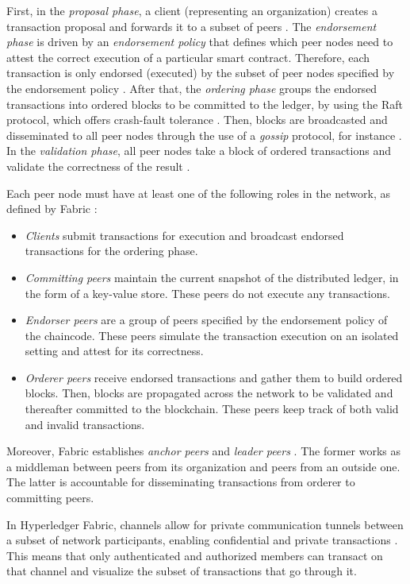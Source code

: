 \documentclass[runningheads]{llncs}
\begin{document}
First, in the \textit{proposal phase}, a client (representing an organization) creates a transaction proposal and forwards it to a subset of peers \cite{hyperledgerlabs}. The \textit{endorsement phase} is driven by an \textit{endorsement policy} that defines which peer nodes need to attest the correct execution of a particular smart contract. Therefore, each transaction is only endorsed (executed) by the subset of peer nodes specified by the endorsement policy \cite{fabric}. After that, the \textit{ordering phase} groups the endorsed transactions into ordered blocks to be committed to the ledger, by using the Raft protocol, which offers crash-fault tolerance \cite{fabric}. Then, blocks are broadcasted and disseminated to all peer nodes through the use of a \textit{gossip} protocol, for instance \cite{fabric}. In the \textit{validation phase}, all peer nodes take a block of ordered transactions and validate the correctness of the result \cite{abrunhosa_2021}.

Each peer node must have at least one of the following roles in the network, as defined by Fabric \cite{hyperledgerlabs}:
\begin{itemize}
    \item \textit{Clients} submit transactions for execution and broadcast endorsed transactions for the ordering phase.
    \item \textit{Committing peers} maintain the current snapshot of the distributed ledger, in the form of a key-value store. These peers do not execute any transactions.
    \item \textit{Endorser peers} are a group of peers specified by the endorsement policy of the chaincode. These peers simulate the transaction execution on an isolated setting and attest for its correctness.
    \item \textit{Orderer peers} receive endorsed transactions and gather them to build ordered blocks. Then, blocks are propagated across the network to be validated and thereafter committed to the blockchain. These peers keep track of both valid and invalid transactions.
\end{itemize}

Moreover, Fabric establishes \textit{anchor peers} and \textit{leader peers} \cite{hyperledgerlabs}. The former works as a middleman between peers from its organization and peers from an outside one. The latter is accountable for disseminating transactions from orderer to committing peers. 

In Hyperledger Fabric, channels allow for private communication tunnels between a subset of network participants, enabling confidential and private transactions \cite{hyperledgerlabs}. This means that only authenticated and authorized members can transact on that channel and visualize the subset of transactions that go through it.
\end{document}
